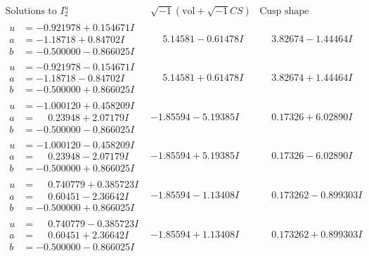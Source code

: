 \documentclass[1p]{elsarticle_modified}
\theoremstyle{definition}
\newcommand{\I}{\sqrt{-1}}
\begin{document}
$$\begin{array}{c|c|c}  
\text{Solutions to }I^u_{2}& \I (\text{vol} + \sqrt{-1}CS) & \text{Cusp shape}\\
 \hline 
\begin{aligned}
u &= -0.921978 + 0.154671 I \\
a &= -1.18718 + 0.84702 I \\
b &= -0.500000 - 0.866025 I\end{aligned}
 & \phantom{-}5.14581 - 0.61478 I & \phantom{-}3.82674 - 1.44464 I \\ \hline\begin{aligned}
u &= -0.921978 - 0.154671 I \\
a &= -1.18718 - 0.84702 I \\
b &= -0.500000 + 0.866025 I\end{aligned}
 & \phantom{-}5.14581 + 0.61478 I & \phantom{-}3.82674 + 1.44464 I \\ \hline\begin{aligned}
u &= -1.000120 + 0.458209 I \\
a &= \phantom{-}0.23948 + 2.07179 I \\
b &= -0.500000 - 0.866025 I\end{aligned}
 & -1.85594 - 5.19385 I & \phantom{-}0.17326 + 6.02890 I \\ \hline\begin{aligned}
u &= -1.000120 - 0.458209 I \\
a &= \phantom{-}0.23948 - 2.07179 I \\
b &= -0.500000 + 0.866025 I\end{aligned}
 & -1.85594 + 5.19385 I & \phantom{-}0.17326 - 6.02890 I \\ \hline\begin{aligned}
u &= \phantom{-}0.740779 + 0.385723 I \\
a &= \phantom{-}0.60451 - 2.36642 I \\
b &= -0.500000 + 0.866025 I\end{aligned}
 & -1.85594 - 1.13408 I & \phantom{-}0.173262 - 0.899303 I \\ \hline\begin{aligned}
u &= \phantom{-}0.740779 - 0.385723 I \\
a &= \phantom{-}0.60451 + 2.36642 I \\
b &= -0.500000 - 0.866025 I\end{aligned}
 & -1.85594 + 1.13408 I & \phantom{-}0.173262 + 0.899303 I \\ \hline\begin{aligned}

\end{aligned}
\end{array}$$
\end{document}
